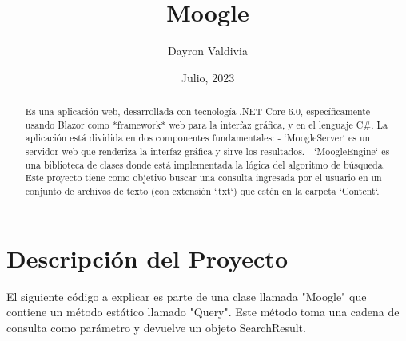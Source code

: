 \documentclass{article}
\begin{document}
\title{Moogle}
\author{Dayron Valdivia}
\date{Julio, 2023}
\maketitle
\begin{abstract}
    Es una aplicación web, desarrollada con tecnología .NET Core 6.0, 
específicamente usando Blazor como *framework* web para la interfaz gráfica, 
y en el lenguaje C#. 
La aplicación está dividida en dos componentes fundamentales: 
- `MoogleServer` es un servidor web que renderiza la interfaz gráfica y sirve los 
resultados. 
- `MoogleEngine` es una biblioteca de clases donde está implementada la 
lógica del algoritmo de búsqueda. 
Este proyecto tiene como objetivo buscar una consulta ingresada por el usuario 
en un conjunto de archivos de texto (con extensión `.txt`) que estén en la 
carpeta `Content`. 
\end{abstract}

\section{Descripción del Proyecto }

El siguiente código a explicar es parte de una clase llamada "Moogle" que 
contiene un método estático llamado "Query". Este método toma una cadena 
de consulta como parámetro y devuelve un objeto SearchResult. 
\end{document}
